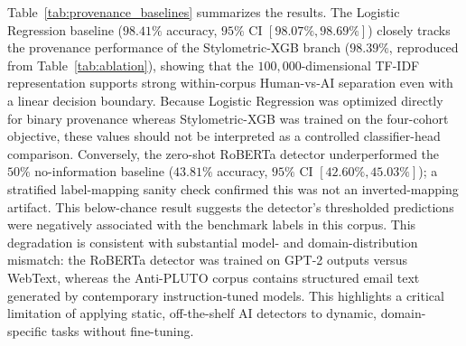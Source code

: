 \documentclass[journal]{IEEEtran}
\begin{document}
Table~\ref{tab:provenance_baselines} summarizes the results. The Logistic Regression baseline ($98.41\%$ accuracy, $95\%$ CI $[98.07\%, 98.69\%]$) closely tracks the provenance performance of the Stylometric-XGB branch ($98.39\%$, reproduced from Table~\ref{tab:ablation}), showing that the $100,000$-dimensional TF-IDF representation supports strong within-corpus Human-vs-AI separation even with a linear decision boundary. Because Logistic Regression was optimized directly for binary provenance whereas Stylometric-XGB was trained on the four-cohort objective, these values should not be interpreted as a controlled classifier-head comparison. Conversely, the zero-shot RoBERTa detector underperformed the $50\%$ no-information baseline ($43.81\%$ accuracy, $95\%$ CI $[42.60\%, 45.03\%]$); a stratified label-mapping sanity check confirmed this was not an inverted-mapping artifact. This below-chance result suggests the detector's thresholded predictions were negatively associated with the benchmark labels in this corpus. This degradation is consistent with substantial model- and domain-distribution mismatch: the RoBERTa detector was trained on GPT-2 outputs versus WebText, whereas the Anti-PLUTO corpus contains structured email text generated by contemporary instruction-tuned models. This highlights a critical limitation of applying static, off-the-shelf AI detectors to dynamic, domain-specific tasks without fine-tuning.
\end{document}
